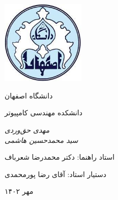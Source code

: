 \documentclass[10pt, oneside]{book}
\begin{document}
    \begin{titlepage}
        \centering
        \includegraphics[width=4cm, height=4cm]{./images/logo}\par
        \vspace{2mm}
        دانشگاه اصفهان \par
        دانشکده مهندسی کامپیوتر \par
        
        \vspace{1cm}
        {\huge {}\par}
        \vspace{3cm}
        {\small\itshape
            مهدی حق‌وردی\\
سید محمدحسین هاشمی \par}
        
        
        \vfill
        استاد راهنما:‌ دکتر محمدرضا شعرباف \par
        دستیار استاد:‌ آقای رضا پورمحمدی
        \vfill
        
        {\large مهر ۱۴۰۲\par}
    \end{titlepage}
\end{document}
